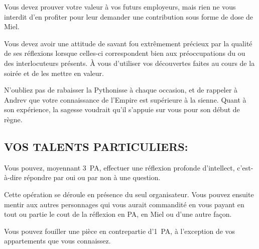 \documentclass[14pt,twocolumn]{extarticle}
\begin{document}
Vous devez prouver votre valeur à vos futurs employeurs, mais rien ne vous
interdit d'en profiter pour leur demander une contribution sous forme de dose
de Miel.

Vous devez avoir une attitude de savant fou extrêmement précieux par la qualité
de ses réflexions lorsque celles-ci correspondent bien aux préoccupations du ou
des interlocuteurs présents. À vous d'utiliser vos découvertes faites au cours
de la soirée et de les mettre en valeur.

N'oubliez pas de rabaisser la Pythonisse à chaque occasion, et de rappeler à
Andrev que votre connaissance de l'Empire est supérieure à la sienne. Quant à
son expérience, la sagesse voudrait qu'il s'appuie sur vous pour son début de
règne.

\subsection{VOS TALENTS PARTICULIERS:}

Vous pouvez, moyennant 3~PA, effectuer une réflexion profonde d'intellect,
c'est-à-dire répondre par oui ou par non à une question.

Cette opération se déroule en présence du seul organisateur. Vous pouvez
ensuite mentir aux autres personnages qui vous aurait commandité en vous
payant en tout ou partie le cout de la réflexion en PA, en Miel ou d'une autre
façon.

Vous pouvez fouiller une pièce en contrepartie d'1~PA, à l'exception de vos
appartements que vous connaissez.
\end{document}
